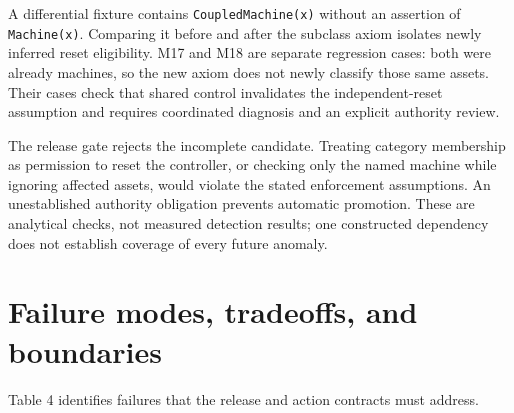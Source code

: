 \documentclass[preprint,12pt,authoryear]{elsarticle}
\begin{document}
A differential fixture contains \texttt{CoupledMachine(x)} without an
assertion of \texttt{Machine(x)}. Comparing it before and after the
subclass axiom isolates newly inferred reset eligibility. M17 and M18
are separate regression cases: both were already machines, so the new
axiom does not newly classify those same assets. Their cases check that
shared control invalidates the independent-reset assumption and requires
coordinated diagnosis and an explicit authority review.

The release gate rejects the incomplete candidate. Treating category
membership as permission to reset the controller, or checking only the
named machine while ignoring affected assets, would violate the stated
enforcement assumptions. An unestablished authority obligation prevents
automatic promotion. These are analytical checks, not measured detection
results; one constructed dependency does not establish coverage of every
future anomaly.

\section{Failure modes, tradeoffs, and
boundaries}\label{failure-modes-tradeoffs-and-boundaries}

Table 4 identifies failures that the release and action contracts must
address.
\end{document}
